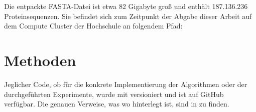         \href{https://ftp.uniprot.org/pub/databases/uniprot/previous_releases/release-2024_02/}{}

        Die entpackte FASTA-Datei ist etwa 82 Gigabyte groß und enthält 187.136.236 Proteinsequenzen. Sie befindet sich zum Zeitpunkt der Abgabe dieser Arbeit auf dem Compute Cluster der Hochschule an folgendem Pfad:


\section{Methoden} %
    \label{sec:methoden}
    Jeglicher Code, ob für die konkrete Implementierung der Algorithmen oder der durchgeführten Experimente, wurde mit versioniert und ist auf GitHub verfügbar. Die genauen Verweise, was wo hinterlegt ist, sind in  zu finden.

